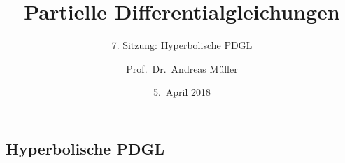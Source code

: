 \documentclass[handout]{beamer}
\title[]{Partielle Differentialgleichungen}
\subtitle{7. Sitzung: Hyperbolische PDGL}
\date[5.~April 2018]{5.~April 2018}
\author{Prof.~Dr.~Andreas Müller}
\begin{document}
\begin{frame}
\section{Hyperbolische PDGL}
\titlepage

\end{frame}


\end{document}
